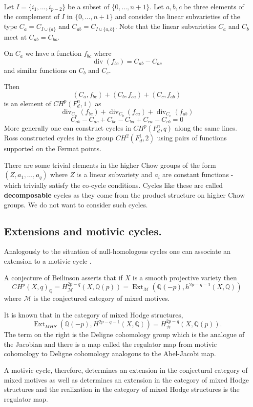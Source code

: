 \documentclass[12pt,reqno]{article}
\newcommand {\Q}{{\mathds Q}}
\newcommand {\M}{{\mathcal M}}
\newcommand {\D}{{\mathcal D}}
\def\div{\operatorname{div}}
\def\Ext{\operatorname{Ext}}
\begin{document}
Let $I=\{i_1,\dots,i_{p-2}\}$ be a subset of $\{0,\dots,n+1\}$. Let $a,b,c$ be three elements of the complement of $I$ in $\{0,\dots,n+1\}$ and consider the linear subvarieties of the type  $C_{a}=C_{I \cup \{a\}}$  and $C_{ab}=C_{I \cup \{a,b\}}$. Note that the linear subvarieties $C_a$ and $C_b$ meet at $C_{ab}=C_{ba}$.  


On $C_a$ we have a function $f_{bc}$ where 
	$$\div(f_{bc})=C_{ab}-C_{ac}$$
	and similar functions on $C_b$ and $C_c$. 
	
Then 
%
$$(C_a,f_{bc})+(C_b,f_{ca})+(C_c,f_{ab})$$ 
%
is an element of $CH^{p}(F_d^n,1)$ as 
%
$$\div_{C_a}(f_{bc})+\div_{C_b}(f_{ca})+\div_{C_c}(f_{ab})$$
$$ C_{ab}-C_{ac}+C_{bc}-C_{ba}+C_{ca}-C_{cb}=0$$
%
More generally one can construct cycles in $CH^p(F_d^n,q)$ along the same lines. Ross \cite{ross} constructed cycles in the group $CH^2(F_d^1,2)$ using pairs of functions supported on the Fermat points. 

There are some trivial elements in the higher Chow groups of the form $(Z,a_1,\dots,a_q)$ where $Z$ is a linear subvariety and $a_i$ are constant functions - which trivially satisfy the co-cycle conditions. Cycles like these are called {\bf decomposable} cycles as they come from the product structure on higher Chow groups. We do not want to consider such cycles.  





\subsection{Extensions and motivic cycles.}

Analogously to the situation of null-homologous cycles one can associate an extension to a motivic cycle \cite{scholl}.


A conjecture of Beilinson asserts that if $X$ is a smooth projective variety then 
%
$$CH^p(X,q)_{\Q}=H^{2p-q}_{\M}(X,\Q(p))=\Ext_{\M}(\Q(-p),h^{2p-q-1}(X,\Q))$$
%
where $\M$ is the conjectured category of mixed motives. 

It is known that in the category of mixed Hodge structures, 
%
$$\Ext_{MHS}(\Q(-p),H^{2p-q-1}(X,\Q))=H^{2p-q}_{\D}(X,\Q(p)).$$
%
The term on the right is the Deligne cohomology group which is the analogue of the Jacobian and there is a map called the regulator map from motivic cohomology to Deligne cohomology analogous to the Abel-Jacobi map. 

A motivic cycle, therefore, determines an extension in the conjectural category of mixed motives as well as determines an extension in the category of mixed Hodge structures and the realization in the category of mixed Hodge structures is the regulator map. 
\end{document}
